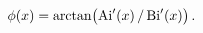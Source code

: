 \[\mathop{\phi\/}\nolimits\!\left(x\right)=\mathop{\mathrm{arctan}\/}\nolimits\!%
\left(\mathop{\mathrm{Ai}\/}\nolimits'\!\left(x\right)/\mathop{\mathrm{Bi}\/}%
\nolimits'\!\left(x\right)\right).\]